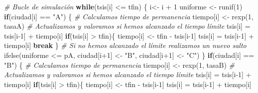 \documentclass[
]{book}
\newenvironment{Shaded}{\begin{snugshade}}{\end{snugshade}}
\newcommand{\CommentTok}[1]{\textcolor[rgb]{0.56,0.35,0.01}{\textit{#1}}}
\newcommand{\ControlFlowTok}[1]{\textcolor[rgb]{0.13,0.29,0.53}{\textbf{#1}}}
\newcommand{\DecValTok}[1]{\textcolor[rgb]{0.00,0.00,0.81}{#1}}
\newcommand{\FunctionTok}[1]{\textcolor[rgb]{0.00,0.00,0.00}{#1}}
\newcommand{\NormalTok}[1]{#1}
\newcommand{\OtherTok}[1]{\textcolor[rgb]{0.56,0.35,0.01}{#1}}
\newcommand{\SpecialCharTok}[1]{\textcolor[rgb]{0.00,0.00,0.00}{#1}}
\newcommand{\StringTok}[1]{\textcolor[rgb]{0.31,0.60,0.02}{#1}}
\theoremstyle{definition}
\theoremstyle{definition}
\theoremstyle{definition}
\theoremstyle{definition}
\theoremstyle{remark}
\begin{document}
\begin{Shaded}
\begin{Highlighting}[]
  \CommentTok{\# Bucle de simulación}
  \ControlFlowTok{while}\NormalTok{(tsis[i] }\SpecialCharTok{\textless{}=}\NormalTok{ tfin)}
\NormalTok{  \{}
\NormalTok{    i}\OtherTok{\textless{}{-}}\NormalTok{ i }\SpecialCharTok{+} \DecValTok{1}
\NormalTok{    uniforme }\OtherTok{\textless{}{-}} \FunctionTok{runif}\NormalTok{(}\DecValTok{1}\NormalTok{)}
    \ControlFlowTok{if}\NormalTok{(ciudad[i] }\SpecialCharTok{==} \StringTok{"A"}\NormalTok{)}
\NormalTok{      \{}
        \CommentTok{\# Calculamos tiempo de permanencia}
\NormalTok{        tiempo[i] }\OtherTok{\textless{}{-}} \FunctionTok{rexp}\NormalTok{(}\DecValTok{1}\NormalTok{, tasaA)}
        \CommentTok{\# Actualizamos y valoramos si hemos alcanzado el tiempo límite}
\NormalTok{        tsis[i] }\OtherTok{=}\NormalTok{ tsis[i}\DecValTok{{-}1}\NormalTok{] }\SpecialCharTok{+}\NormalTok{ tiempo[i]}
        \ControlFlowTok{if}\NormalTok{(tsis[i] }\SpecialCharTok{\textgreater{}}\NormalTok{ tfin)\{}
\NormalTok{            tiempo[i] }\OtherTok{\textless{}{-}}\NormalTok{ tfin }\SpecialCharTok{{-}}\NormalTok{ tsis[i}\DecValTok{{-}1}\NormalTok{] }
\NormalTok{            tsis[i] }\OtherTok{=}\NormalTok{ tsis[i}\DecValTok{{-}1}\NormalTok{] }\SpecialCharTok{+}\NormalTok{ tiempo[i]}
            \ControlFlowTok{break}
\NormalTok{          \}}
        \CommentTok{\# Si no hemos alcanzado el límite realizamos un nuevo salto}
        \FunctionTok{ifelse}\NormalTok{(uniforme }\SpecialCharTok{\textless{}=}\NormalTok{ pA, ciudad[i}\SpecialCharTok{+}\DecValTok{1}\NormalTok{] }\OtherTok{\textless{}{-}} \StringTok{"B"}\NormalTok{, ciudad[i}\SpecialCharTok{+}\DecValTok{1}\NormalTok{] }\OtherTok{\textless{}{-}} \StringTok{"C"}\NormalTok{)}
\NormalTok{      \}}
    \ControlFlowTok{if}\NormalTok{(ciudad[i] }\SpecialCharTok{==} \StringTok{"B"}\NormalTok{)}
\NormalTok{      \{}
        \CommentTok{\# Calculamos tiempo de permanencia}
\NormalTok{        tiempo[i] }\OtherTok{\textless{}{-}} \FunctionTok{rexp}\NormalTok{(}\DecValTok{1}\NormalTok{, tasaB)}
        \CommentTok{\# Actualizamos y valoramos si hemos alcanzado el tiempo límite}
\NormalTok{        tsis[i] }\OtherTok{=}\NormalTok{ tsis[i}\DecValTok{{-}1}\NormalTok{] }\SpecialCharTok{+}\NormalTok{ tiempo[i]}
        \ControlFlowTok{if}\NormalTok{(tsis[i] }\SpecialCharTok{\textgreater{}}\NormalTok{ tfin)\{}
\NormalTok{            tiempo[i] }\OtherTok{\textless{}{-}}\NormalTok{ tfin }\SpecialCharTok{{-}}\NormalTok{ tsis[i}\DecValTok{{-}1}\NormalTok{] }
\NormalTok{            tsis[i] }\OtherTok{=}\NormalTok{ tsis[i}\DecValTok{{-}1}\NormalTok{] }\SpecialCharTok{+}\NormalTok{ tiempo[i]}

\end{Highlighting}
\end{Shaded}
\end{document}

